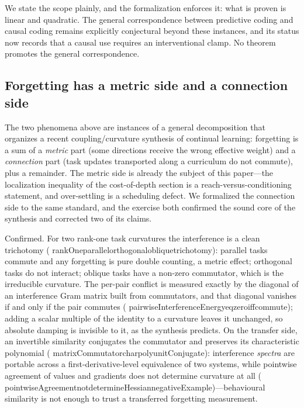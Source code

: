 \documentclass[11pt]{article}
\newcommand{\leanname}[1]{{\scriptsize\ttfamily
  \def\_{\textunderscore\allowbreak}#1}}
\begin{document}
We state the scope plainly, and the formalization enforces it: what is proven is linear
and quadratic. The general correspondence between predictive coding and causal coding
remains explicitly conjectural beyond these instances, and its status now records that a
causal use requires an interventional clamp.  No theorem promotes the general
correspondence.

\subsection{Forgetting has a metric side and a connection side}
\label{sec:forgetting-geometry}

The two phenomena above are instances of a general decomposition that organizes a
recent coupling/curvature synthesis of continual learning: forgetting is a sum of a
\emph{metric} part (some directions receive the wrong effective weight) and a
\emph{connection} part (task updates transported along a curriculum do not commute), plus
a remainder. The metric side is already the subject of this paper---the localization
inequality of the cost-of-depth section is a reach-versus-conditioning statement, and
over-settling is a scheduling defect. We formalized the connection side to the same
standard, and the exercise both confirmed the sound core of the synthesis and corrected
two of its claims.

Confirmed. For two rank-one task curvatures the interference is a clean trichotomy
(\leanname{rankOne\_parallel\_orthogonal\_oblique\_trichotomy}): parallel tasks commute and
any forgetting is pure double counting, a metric effect; orthogonal tasks do not interact;
oblique tasks have a non-zero commutator, which is the irreducible curvature. The
per-pair conflict is measured exactly by the diagonal of an interference Gram matrix built
from commutators, and that diagonal vanishes if and only if the pair commutes
(\leanname{pairwiseInterferenceEnergy\_eq\_zero\_iff\_commute}); adding a scalar multiple of the
identity to a curvature leaves it unchanged, so absolute damping is invisible to it, as the
synthesis predicts. On the transfer side, an invertible similarity conjugates the
commutator and preserves its characteristic polynomial
(\leanname{matrixCommutator\_charpoly\_unitConjugate}): interference \emph{spectra} are portable
across a first-derivative-level equivalence of two systems, while pointwise agreement of
values and gradients does not determine curvature at all
(\leanname{pointwiseAgreement\_not\_determineHessian\_negativeExample})---behavioural similarity
is not enough to trust a transferred forgetting measurement.
\end{document}
